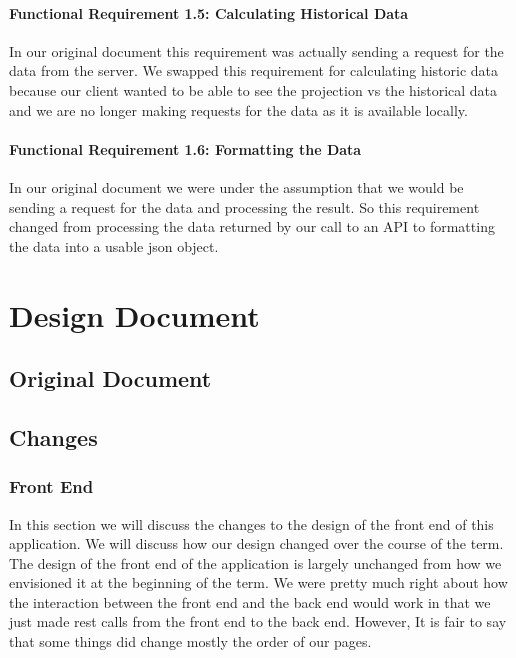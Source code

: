 \documentclass[onecolumn, draftclsnofoot,10pt, compsoc]{article}
\begin{document}
		    \paragraph{Functional Requirement 1.5: Calculating Historical Data}
		    In our original document this requirement was actually sending a request for the data from the server. We swapped this requirement for calculating historic data because our client wanted to be able to see the projection vs the historical data and we are no longer making requests for the data as it is available locally.\\

		    \paragraph{Functional Requirement 1.6: Formatting the Data}
		    In our original document we were under the assumption that we would be sending a request for the data and processing the result. So this requirement changed from processing the data returned by our call to an API to formatting the data into a usable json object.\\

\section{Design Document}
    \subsection{Original Document}
        
        
    \subsection{Changes}
    
        \subsubsection{Front End}
        In this section we will discuss the changes to the design of the front end of this application. We will discuss how our design changed over the course of the term.\\
        
        The design of the front end of the application is largely unchanged from how we envisioned it at the beginning of the term. We were pretty much right about how the interaction between the front end and the back end would work in that we just made rest calls from the front end to the back end. However, It is fair to say that some things did change mostly the order of our pages.\\
        
\end{document}
